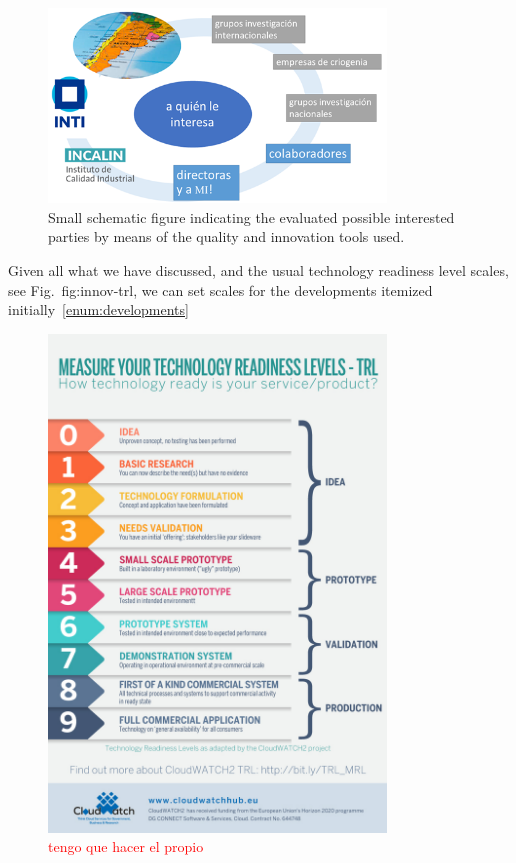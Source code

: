 \begin{figure}
    \includegraphics[width=0.8\textwidth]{figures/innovation/interested-parties.png}
    \caption{Small schematic figure indicating the evaluated possible interested parties by means of the quality and innovation tools used.}
    \label{fig:innov-interested-parties}
\end{figure}

Given all what we have discussed, and the usual technology readiness level scales, see Fig.~{fig:innov-trl}, we can set scales for the developments itemized initially~\ref{enum:developments}
\begin{figure}
    \includegraphics[width=0.8\textwidth]{figures/innovation/trl.jpg}
    \caption{\textcolor{red}{tengo que hacer el propio}}
    \label{fig:innov-trl}
\end{figure}


